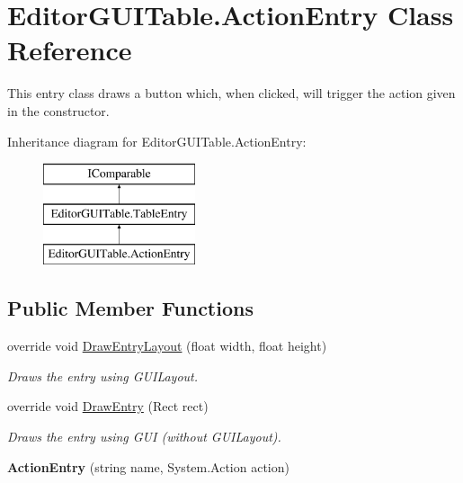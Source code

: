 \hypertarget{class_editor_g_u_i_table_1_1_action_entry}{}\section{Editor\+G\+U\+I\+Table.\+Action\+Entry Class Reference}
\label{class_editor_g_u_i_table_1_1_action_entry}


This entry class draws a button which, when clicked, will trigger the action given in the constructor.  


Inheritance diagram for Editor\+G\+U\+I\+Table.\+Action\+Entry\+:\begin{figure}[H]
\begin{center}
\leavevmode
\includegraphics[height=3.000000cm]{class_editor_g_u_i_table_1_1_action_entry}
\end{center}
\end{figure}
\subsection*{Public Member Functions}
\begin{DoxyCompactItemize}
\item 
override void \mbox{\hyperlink{class_editor_g_u_i_table_1_1_action_entry_ae556137b72e1e356a2e4cf4a12b88336}{Draw\+Entry\+Layout}} (float width, float height)
\begin{DoxyCompactList}\small\item\em Draws the entry using G\+U\+I\+Layout. \end{DoxyCompactList}\item 
override void \mbox{\hyperlink{class_editor_g_u_i_table_1_1_action_entry_a84dfbc114f27c8108899c3c25803ae60}{Draw\+Entry}} (Rect rect)
\begin{DoxyCompactList}\small\item\em Draws the entry using G\+UI (without G\+U\+I\+Layout). \end{DoxyCompactList}\item 
\mbox{\label{class_editor_g_u_i_table_1_1_action_entry_aa122ca24d9455d04facc8790c7977010}} 
{\bfseries Action\+Entry} (string name, System.\+Action action)
\end{DoxyCompactItemize}
